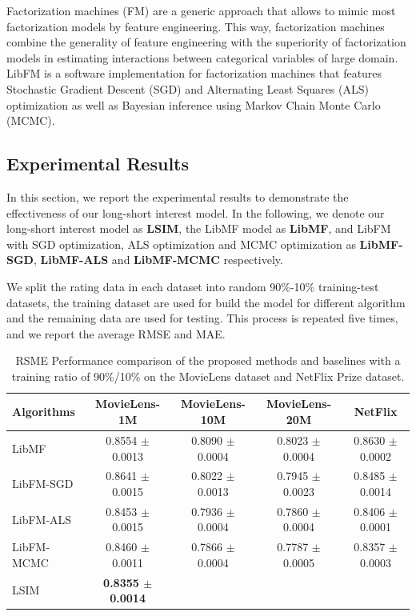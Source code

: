 \documentclass{sig-alternate-05-2015}
\begin{document}
Factorization machines (FM) are a generic approach that
allows to mimic most factorization models by feature engineering.
This way, factorization machines combine the generality of
feature engineering with the superiority of factorization models
in estimating interactions between categorical variables of large domain.
LibFM \cite{rendle2012factorization} is a software implementation
for factorization machines that features
Stochastic Gradient Descent (SGD) and
Alternating Least Squares (ALS) optimization as well as
Bayesian inference using Markov Chain Monte Carlo (MCMC).

\subsection{Experimental Results}
In this section, we report the experimental results to demonstrate
the effectiveness of our long-short interest model.
In the following, we denote our long-short interest model as \textbf{LSIM},
the LibMF model as \textbf{LibMF}, and LibFM with SGD optimization,
ALS optimization and MCMC optimization as \textbf{LibMF-SGD},
\textbf{LibMF-ALS} and \textbf{LibMF-MCMC} respectively.

We split the rating data in each dataset into random 90\%-10\% training-test datasets,
the training dataset are used for build the model for different algorithm and
the remaining data are used for testing. This process is repeated five times,
and we report the average RMSE and MAE.

\begin{table}[htpb]
	\centering
	\caption{RSME Performance comparison of the proposed methods and baselines with a training ratio of 90\%/10\%
    on the MovieLens dataset and NetFlix Prize dataset.}
	\label{tab:msre}
	\begin{tabular}{|l|c|c|c|c|}
		\hline
		\textbf{Algorithms} & \textbf{MovieLens-1M} & \textbf{MovieLens-10M} & \textbf{MovieLens-20M}  & \textbf{NetFlix} \\
		\hline
		LibMF      & 0.8554 $\pm$ 0.0013 & 0.8090 $\pm$ 0.0004 & 0.8023 $\pm$ 0.0004 & 0.8630 $\pm$ 0.0002 \\
		LibFM-SGD  & 0.8641 $\pm$ 0.0015 & 0.8022 $\pm$ 0.0013 & 0.7945 $\pm$ 0.0023 & 0.8485 $\pm$ 0.0014 \\
		LibFM-ALS  & 0.8453 $\pm$ 0.0015 & 0.7936 $\pm$ 0.0004 & 0.7860 $\pm$ 0.0004 & 0.8406 $\pm$ 0.0001 \\
        LibFM-MCMC & 0.8460 $\pm$ 0.0011 & 0.7866 $\pm$ 0.0004 & 0.7787 $\pm$ 0.0005 & 0.8357 $\pm$ 0.0003 \\
		LSIM       & \textbf{0.8355 $\pm$ 0.0014} &  &  & \\
		\hline
	\end{tabular}
\end{table}
\end{document}
